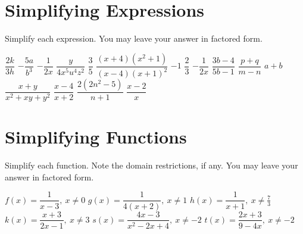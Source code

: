 \section*{Simplifying Expressions}
Simplify each expression.  You may leave your answer in factored form.
\begin{smenum}
\mitemxxxx
{$\dfrac{2k}{3h}$}
{$-\dfrac{5a}{b^3}$}
{$-\dfrac{1}{2x}$}
{$\dfrac{y}{4x^5u^4z^2}$}
\mitemxxx
{$\dfrac{3}{5}$}
{$\dfrac{(x+4)(x^2+1)}{(x-4)(x+1)^2}$}
{$-1$}
\mitemxxx
{$\dfrac{2}{3}$}
{$-\dfrac{1}{2x}$}
{$\dfrac{3b-4}{5b-1}$}
\mitemxxx
{$\dfrac{p+q}{m-n}$}
{$a+b$}
{$\dfrac{x+y}{x^2+xy+y^2}$}
\mitemxxx
{$\dfrac{x-4}{x+2}$}
{$\dfrac{2(2n^2-5)}{n+1}$}
{$\dfrac{x-2}{x}$}
\end{smenum}

\section*{Simplifying Functions}
Simplify each function.  Note the domain restrictions, if any. You may leave your answer in factored form.
\begin{smenum}
\mitemxxx
{$f(x)=\dfrac{1}{x-3},\ x\neq 0$}
{$g(x)=\dfrac{1}{4(x+2)},\ x\neq 1$}
{$h(x)=\dfrac{1}{x+1},\ x\neq\frac{7}{3}$}
\mitemxxx
{$k(x)=\dfrac{x+3}{2x-1},\ x\neq 3$}
{$s(x)=\dfrac{4x-3}{x^2-2x+4},\ x\neq-2$}
{$t(x)=\dfrac{2x+3}{9-4x},\ x\neq-2$}
\end{smenum}


